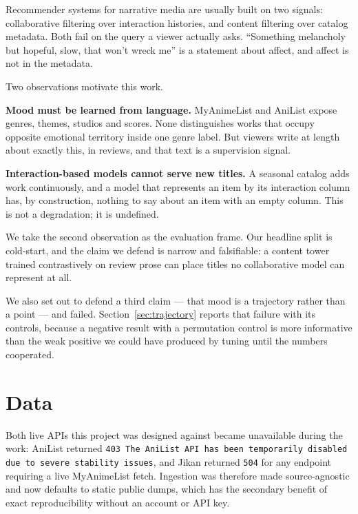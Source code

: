 \documentclass[11pt,a4paper]{article}
\begin{document}
Recommender systems for narrative media are usually built on two signals:
collaborative filtering over interaction histories, and content filtering over
catalog metadata. Both fail on the query a viewer actually asks. ``Something
melancholy but hopeful, slow, that won't wreck me'' is a statement about
affect, and affect is not in the metadata.

Two observations motivate this work.

\textbf{Mood must be learned from language.} MyAnimeList and AniList expose
genres, themes, studios and scores. None distinguishes works that occupy
opposite emotional territory inside one genre label. But viewers write at length
about exactly this, in reviews, and that text is a supervision signal.

\textbf{Interaction-based models cannot serve new titles.} A seasonal catalog
adds work continuously, and a model that represents an item by its interaction
column has, by construction, nothing to say about an item with an empty column.
This is not a degradation; it is undefined.

We take the second observation as the evaluation frame. Our headline split is
cold-start, and the claim we defend is narrow and falsifiable: a content tower
trained contrastively on review prose can place titles no collaborative model
can represent at all.

We also set out to defend a third claim --- that mood is a trajectory rather
than a point --- and failed. Section~\ref{sec:trajectory} reports that failure
with its controls, because a negative result with a permutation control is more
informative than the weak positive we could have produced by tuning until the
numbers cooperated.

\section{Data}

Both live APIs this project was designed against became unavailable during the
work: AniList returned \texttt{403 The AniList API has been temporarily disabled
due to severe stability issues}, and Jikan returned \texttt{504} for any
endpoint requiring a live MyAnimeList fetch. Ingestion was therefore made
source-agnostic and now defaults to static public dumps, which has the secondary
benefit of exact reproducibility without an account or API key.
\end{document}
